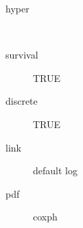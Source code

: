 \begin{description}
	\item[hyper]\ 
	\item[survival] TRUE
	\item[discrete] TRUE
	\item[link] default log
	\item[pdf] coxph
\end{description}
